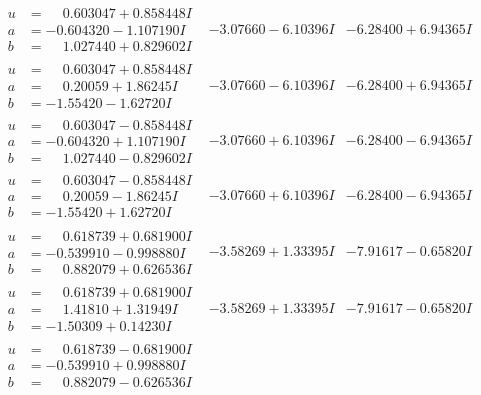 \documentclass[1p]{elsarticle_modified}
\theoremstyle{definition}
\begin{document}
$$\begin{array}{c|c|c}
\begin{aligned}
u &= \phantom{-}0.603047 + 0.858448 I \\
a &= -0.604320 - 1.107190 I \\
b &= \phantom{-}1.027440 + 0.829602 I\end{aligned}
 & -3.07660 - 6.10396 I & -6.28400 + 6.94365 I \\ \hline\begin{aligned}
u &= \phantom{-}0.603047 + 0.858448 I \\
a &= \phantom{-}0.20059 + 1.86245 I \\
b &= -1.55420 - 1.62720 I\end{aligned}
 & -3.07660 - 6.10396 I & -6.28400 + 6.94365 I \\ \hline\begin{aligned}
u &= \phantom{-}0.603047 - 0.858448 I \\
a &= -0.604320 + 1.107190 I \\
b &= \phantom{-}1.027440 - 0.829602 I\end{aligned}
 & -3.07660 + 6.10396 I & -6.28400 - 6.94365 I \\ \hline\begin{aligned}
u &= \phantom{-}0.603047 - 0.858448 I \\
a &= \phantom{-}0.20059 - 1.86245 I \\
b &= -1.55420 + 1.62720 I\end{aligned}
 & -3.07660 + 6.10396 I & -6.28400 - 6.94365 I \\ \hline\begin{aligned}
u &= \phantom{-}0.618739 + 0.681900 I \\
a &= -0.539910 - 0.998880 I \\
b &= \phantom{-}0.882079 + 0.626536 I\end{aligned}
 & -3.58269 + 1.33395 I & -7.91617 - 0.65820 I \\ \hline\begin{aligned}
u &= \phantom{-}0.618739 + 0.681900 I \\
a &= \phantom{-}1.41810 + 1.31949 I \\
b &= -1.50309 + 0.14230 I\end{aligned}
 & -3.58269 + 1.33395 I & -7.91617 - 0.65820 I \\ \hline\begin{aligned}
u &= \phantom{-}0.618739 - 0.681900 I \\
a &= -0.539910 + 0.998880 I \\
b &= \phantom{-}0.882079 - 0.626536 I\end{aligned}

\end{array}$$
\end{document}
